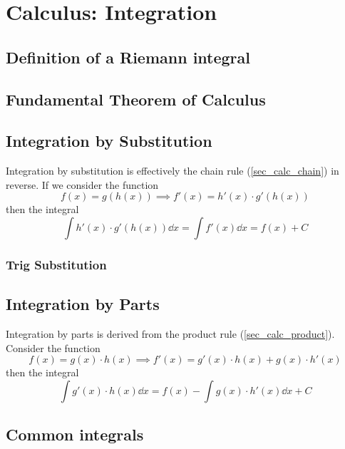 \section{Calculus: Integration}

\subsection{Definition of a Riemann integral}

\subsection{Fundamental Theorem of Calculus} \label{sec_calc_FTC}

\subsection{Integration by Substitution} \label{sec_calc_substitution}

Integration by substitution is effectively the chain rule
(\ref{sec_calc_chain}) in reverse. If we consider the function
\begin{equation*}
f(x) = g(h(x)) \implies f'(x) = h'(x) \cdot g'(h(x))
\end{equation*}
then the integral
\begin{equation}
\int h'(x) \cdot g'(h(x)) \dd{x} = \int f'(x) \dd{x} = f(x) + C
\end{equation}

\subsubsection{Trig Substitution} \label{sec_calc_trig_substitution}

\subsection{Integration by Parts}

Integration by parts is derived from the product rule
(\ref{sec_calc_product}).  Consider the function
\begin{equation*}
f(x) = g(x) \cdot h(x) \implies f'(x) = g'(x) \cdot h(x) + g(x) \cdot h'(x)
\end{equation*}
then the integral
\begin{equation}
\int g'(x) \cdot h(x) \dd{x} = f(x) - \int g(x) \cdot h'(x) \dd{x} + C
\end{equation}


\subsection{Common integrals}

